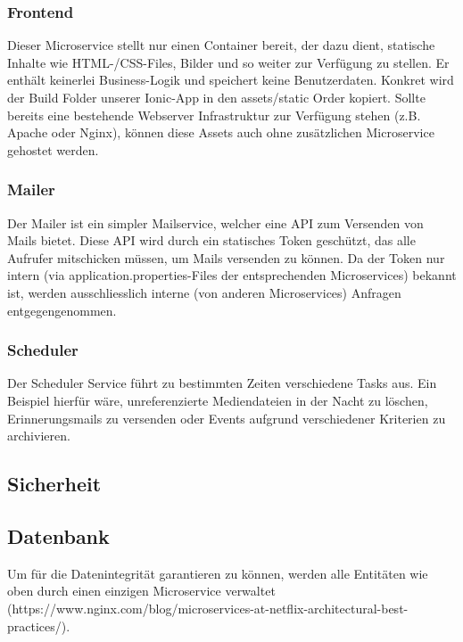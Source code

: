 \documentclass[11pt]{article} %
\begin{document}
\subsubsection{Frontend}
Dieser Microservice stellt nur einen Container bereit, der dazu dient, statische Inhalte wie HTML-/CSS-Files, Bilder und so weiter zur Verfügung zu stellen. Er enthält keinerlei Business-Logik und speichert keine Benutzerdaten. Konkret wird der Build Folder unserer Ionic-App in den assets/static Order kopiert. Sollte bereits eine bestehende Webserver Infrastruktur zur Verfügung stehen (z.B. Apache oder Nginx), können diese Assets auch ohne zusätzlichen Microservice gehostet werden.

\subsubsection{Mailer}
Der Mailer ist ein simpler Mailservice, welcher eine API zum Versenden von Mails bietet. Diese API wird durch ein statisches Token geschützt, das alle Aufrufer mitschicken müssen, um Mails versenden zu können. Da der Token nur intern (via application.properties-Files der entsprechenden Microservices) bekannt ist, werden ausschliesslich interne (von anderen Microservices) Anfragen entgegengenommen.

\subsubsection{Scheduler}
Der Scheduler Service führt zu bestimmten Zeiten verschiedene Tasks aus. Ein Beispiel hierfür wäre, unreferenzierte  Mediendateien in der Nacht zu löschen, Erinnerungsmails zu versenden oder Events aufgrund verschiedener Kriterien zu archivieren.

\newpage
\subsection{Sicherheit}


\newpage
\subsection{Datenbank}
Um für die Datenintegrität garantieren zu können, werden alle Entitäten wie oben durch einen einzigen Microservice verwaltet (https://www.nginx.com/blog/microservices-at-netflix-architectural-best-practices/).
\end{document}
